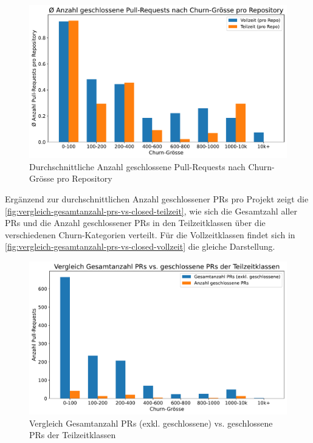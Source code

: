 \begin{figure}[htbp]
    \includegraphics[width=\textwidth]{Figures/avg-anz-clsd-prs-nach-churn.pdf}
    \caption{Durchschnittliche Anzahl geschlossene Pull-Requests nach Churn-Grösse pro Repository}
    \label{fig:avg-anz-clsd-prs-nach-churn}
\end{figure}

\newpage
Ergänzend zur durchschnittlichen Anzahl geschlossener PRs pro Projekt zeigt die \autoref{fig:vergleich-gesamtanzahl-prs-vs-closed-teilzeit}, wie sich die Gesamtzahl aller PRs und die Anzahl geschlossener PRs in den Teilzeitklassen über die verschiedenen Churn-Kategorien verteilt. Für die Vollzeitklassen findet sich in \autoref{fig:vergleich-gesamtanzahl-prs-vs-closed-vollzeit} die gleiche Darstellung.

\begin{figure}[htbp]
    \includegraphics[width=\textwidth]{Figures/vergleich-gesamtanzahl-prs-vs-closed-teilzeit.pdf}
    \caption{Vergleich Gesamtanzahl PRs (exkl. geschlossene) vs. geschlossene PRs der Teilzeitklassen}
    \label{fig:vergleich-gesamtanzahl-prs-vs-closed-teilzeit}
\end{figure}

